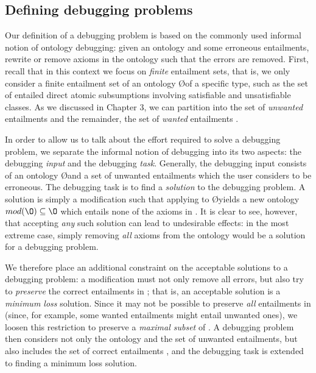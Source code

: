 \subsection{Defining debugging problems}

Our definition of a debugging problem is based on the commonly used informal notion of ontology debugging: given an ontology and some erroneous entailments, rewrite or remove axioms in the  ontology such that the errors are removed. First, recall that in this context we focus on \emph{finite} entailment sets, that is, we only consider a finite entailment set \entset of an ontology \O of a specific type, such as the set of entailed direct atomic subsumptions involving satisfiable and unsatisfiable classes. As we discussed in Chapter 3, we can partition \entset into the set of \emph{unwanted} entailments \entsetminus and the remainder, the set of \emph{wanted} entailments \entsetplus.

In order to allow us to talk about the effort required to solve a debugging problem, we separate the informal notion of debugging into its two aspects: the debugging \emph{input} and the debugging \emph{task}. Generally, the debugging input consists of an ontology \O and a set \entsetminus of unwanted entailments which the user considers to be erroneous. The debugging task is to find a \emph{solution} to the debugging problem. A solution is simply a modification \modif such that applying \modif to \O yields a new ontology $mod(\O) \subseteq \O$  which entails none of the axioms in \entsetminus. It is clear to see, however, that accepting \emph{any} such solution can lead to undesirable effects: in the most extreme case, simply removing \emph{all} axioms from the ontology would be a solution for a debugging problem.

We therefore place an additional constraint on the acceptable solutions to a debugging problem: a modification \modif must not only remove all errors, but also try to \emph{preserve} the correct entailments in \entsetplus; that is, an acceptable solution is a \emph{minimum loss} solution. Since it may not be possible to preserve \emph{all} entailments in \entsetplus (since, for example, some wanted entailments might entail unwanted ones), we loosen this restriction to preserve a \emph{maximal subset} \entsetstar of \entsetplus. A debugging problem then considers not only the ontology and the set of unwanted entailments, but also includes the set of correct entailments \entsetplus, and the debugging task is extended to finding a minimum loss solution.

